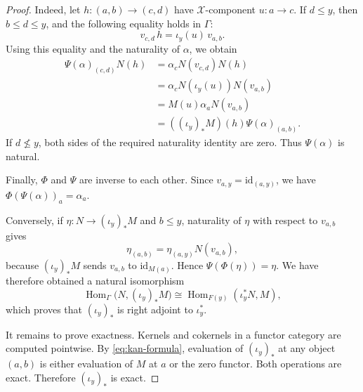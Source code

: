 \documentclass[10pt,a4paper]{amsart}
\newcommand{\G}{\Gamma}
\newcommand{\Hom}{\operatorname{Hom}}
\newcommand{\X}{\mathcal X}
\newcommand{\id}{\mathrm{id}}
\begin{document}
\begin{proof}
Indeed, let $h:(a,b)\longrightarrow(c,d)$
have $\X$-component $u:a\to c$. If $d\leq y$, then
$b\leq d\leq y$, and the following equality holds in $\G$:
\[
v_{c,d}\,h
=
\iota_y(u)\,v_{a,b}.
\]
Using this equality and the naturality of $\alpha$, we obtain
\[
\begin{split}
\Psi(\alpha)_{(c,d)}N(h)
&=
\alpha_cN(v_{c,d})N(h)\\
&=
\alpha_cN(\iota_y(u))N(v_{a,b})\\
&=
M(u)\alpha_aN(v_{a,b})\\
&=
((\iota_y)_*M)(h)\Psi(\alpha)_{(a,b)}.
\end{split}
\]
If $d\nleq y$, both sides of the required naturality identity are zero.
Thus $\Psi(\alpha)$ is natural.

Finally, $\Phi$ and $\Psi$ are inverse to each other. Since
$v_{a,y}=\id_{(a,y)}$, we have $\Phi(\Psi(\alpha))_a=\alpha_a$.

Conversely, if $\eta:N\to(\iota_y)_*M$ and $b\leq y$, naturality of
$\eta$ with respect to $v_{a,b}$ gives
\[
\eta_{(a,b)}
=
\eta_{(a,y)}N(v_{a,b}),
\]
because $(\iota_y)_*M$ sends $v_{a,b}$ to $\id_{M(a)}$. Hence $\Psi(\Phi(\eta))=\eta$.
We have therefore obtained a natural isomorphism
\[
\Hom_{\G}\bigl(N,(\iota_y)_*M\bigr)
\cong
\Hom_{F(y)}(\iota_y^*N,M),
\]
which proves that $(\iota_y)_*$ is right adjoint to $\iota_y^*$.

It remains to prove exactness. Kernels and cokernels in a functor
category are computed pointwise. By \eqref{eq:kan-formula}, evaluation
of $(\iota_y)_*$ at any object $(a,b)$ is either evaluation of $M$ at
$a$ or the zero functor. Both operations are exact. Therefore
$(\iota_y)_*$ is exact.
\end{proof}
\end{document}
